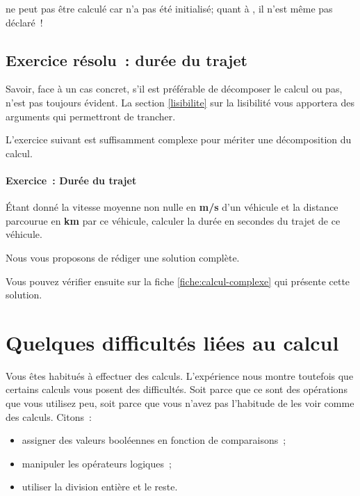 			 ne peut pas être calculé car  n’a pas été initialisé;
			quant à , il n’est même pas déclaré~!


		\subsection{Exercice résolu~: durée du trajet}
					
			Savoir, face à un cas concret, s’il est préférable 
			de décomposer le calcul ou pas, n’est pas toujours évident.	
			La section \vref{lisibilite}
			sur la lisibilité vous apportera des arguments
			qui permettront de trancher.

			L'exercice suivant est suffisamment complexe pour mériter une 
			décomposition du calcul. 

			\begin{Emphase}
				\paragraph{Exercice~: Durée du trajet}
				\label{algo:durée}
				Étant donné la vitesse moyenne non nulle en \textbf{m/s} d’un
				véhicule et la distance parcourue en \textbf{km} par ce
				véhicule, calculer la durée en secondes du trajet de ce
				véhicule.
			\end{Emphase}

			Nous vous proposons de rédiger une solution complète.
			
			Vous pouvez vérifier ensuite sur la fiche \vref{fiche:calcul-complexe}
			qui présente cette solution.
				

	\section{Quelques difficultés liées au calcul}
	
		Vous êtes habitués à effectuer des calculs.  L’expérience nous montre
		toutefois que certains calculs vous posent des difficultés.  Soit parce
		que ce sont des opérations que vous utilisez peu, soit parce que vous
		n’avez pas l’habitude de les voir comme des calculs.  Citons~:

		\begin{itemize}
		\item
			assigner des valeurs booléennes 
			en fonction de comparaisons~;
		\item
			manipuler les opérateurs logiques~;
		\item
			utiliser la division entière et le reste.
		\end{itemize}
		
